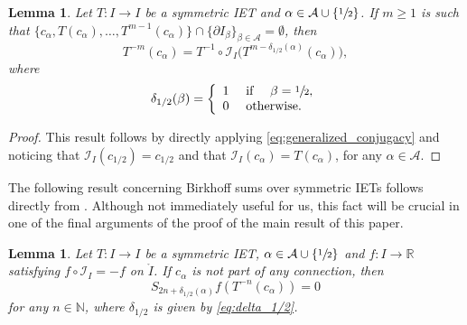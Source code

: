 \documentclass[10pt,a4paper]{amsart}
\theoremstyle{plain}
\newtheorem{lemma}[theorem]{Lemma}
\theoremstyle{definition}
\newcommand{\A}{\mathcal{A}}
\newcommand{\I}{\mathcal{I}}
\newcommand{\N}{\mathbb{N}}
\newcommand{\R}{\mathbb{R}}
\begin{document}
\begin{lemma}
\label{lem:inverse_iterates}
Let $T: I \to I$ be a symmetric IET and $\alpha \in \A \cup \{\sfrac{1}{2}\}$. If $m \geq 1$ is such that $\{c_\alpha, T(c_\alpha), \ldots, T^{m - 1}(c_\alpha)\} \cap \{\partial I_\beta\}_{\beta \in \A} = \emptyset$, then\vspace*{-3pt}
\begin{equation}
\label{eq:inverse_iterates}
T^{-m}(c_\alpha) =
{T^{-1} \circ \I_I} \big( T^{m - \delta_{1/2}(\alpha)}(c_\alpha) \big),
\end{equation}
where\vspace*{-3pt}
\begin{equation}
\label{eq:delta_1/2}
\delta_{1/2}(\beta) = \left\{\begin{array}{ll} 1 & \text{ if } \quad \beta = \sfrac{1}{2}, \\
0 & \text{ otherwise}.
\end{array} \right.
\end{equation}
\end{lemma}

\begin{proof}
This result follows by directly applying \eqref{eq:generalized_conjugacy} and noticing that $\I_I(c_{1/2}) = c_{1/2}$ and that $\I_I(c_\alpha) = T(c_\alpha)$, for any $\alpha \in \A$.
\end{proof}

The following result concerning Birkhoff sums over symmetric IETs follows
directly from \cite[Lem.\,3.11]{berk_ergodicity_2023}. Although not
immediately useful for us, this fact will be crucial in one of the final
arguments of the proof of the main result of this paper.
\begin{lemma}\label{lem: berktrujillo}
Let $T: I \to I$ be a symmetric IET, $\alpha \in \A \cup\{\sfrac{1}{2}\}$ and $f : I\to \R$ satisfying $f\circ \I_I=-f$ on $\mathring I$. If $c_{\alpha}$ is not part of any connection, then\vspace*{-3pt}
\[
S_{2n + \delta_{1/2}(\alpha)}f(T^{-n}(c_{\alpha})) = 0
\]
for any $n\in\N$, where $\delta_{1/2}$ is given by \eqref{eq:delta_1/2}.
\end{lemma}
\end{document}

